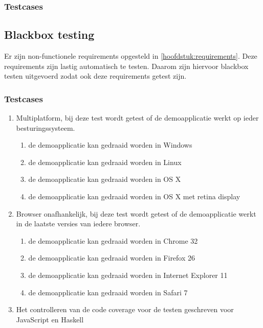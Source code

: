 \subsubsection{Testcases}



\subsection{Blackbox testing}
Er zijn non-functionele requirements opgesteld in \autoref{hoofdstuk:requirements}. Deze requirements zijn lastig automatisch te testen. Daarom zijn hiervoor blackbox testen uitgevoerd zodat ook deze requirements getest zijn.

\subsubsection{Testcases}
\begin{enumerate}[label={T\arabic*}]
	\setcounter{enumi}{\value{startvaluetest}}
	\item Multiplatform, bij deze test wordt getest of de demoapplicatie werkt op ieder besturingssysteem.
    \begin{enumerate}[label={T\arabic{enumi}.\arabic*}]
    	\item de demoapplicatie kan gedraaid worden in Windows
    	\item de demoapplicatie kan gedraaid worden in Linux
    	\item de demoapplicatie kan gedraaid worden in OS X
    	\item de demoapplicatie kan gedraaid worden in OS X met retina display
    \end{enumerate}
	\item Browser onafhankelijk, bij deze test wordt getest of de demoapplicatie werkt in de laatste versies van iedere browser.
    \begin{enumerate}[label={T\arabic{enumi}.\arabic*}]
    	\item de demoapplicatie kan gedraaid worden in Chrome 32
    	\item de demoapplicatie kan gedraaid worden in Firefox 26
    	\item de demoapplicatie kan gedraaid worden in Internet Explorer 11
    	\item de demoapplicatie kan gedraaid worden in Safari 7
    \end{enumerate}
	\item Het controlleren van de code coverage voor de testen geschreven voor JavaScript en Haskell
\end{enumerate}


